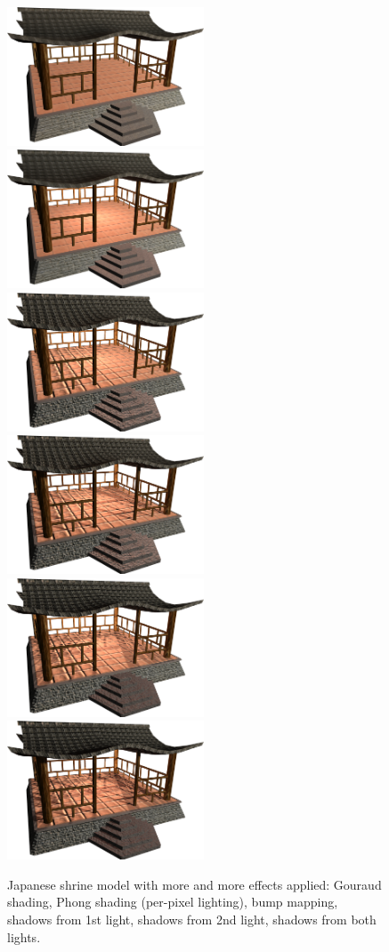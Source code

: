 \documentclass{acmsiggraph}                     %
\begin{document}
\begin{figure}[t]
  \centering
  \includegraphics[width=2.3in]{rhan_shrine_0}
  \includegraphics[width=2.3in]{rhan_shrine_1_per_pixel_lighting}
  \includegraphics[width=2.3in]{rhan_shrine_2_bump_mapping}
  \includegraphics[width=2.3in]{rhan_shrine_3_shadow_1st}
  \includegraphics[width=2.3in]{rhan_shrine_4_shadow_2nd}
  \includegraphics[width=2.3in]{rhan_shrine_5_everything}
  \caption{Japanese shrine model with more and more effects applied: Gouraud shading,
Phong shading (per-pixel lighting), bump mapping, shadows from 1st light,
shadows from 2nd light, shadows from both lights.}
\end{figure}
\end{document}
